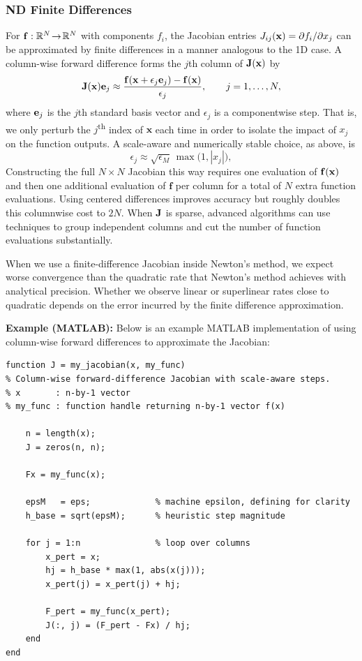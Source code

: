 \subsubsection{ND Finite Differences}
For $\mathbf{f}:\mathbb{R}^N\!\to\!\mathbb{R}^N$ with components $f_i$, the Jacobian entries $J_{ij}(\mathbf{x})=\partial f_i/\partial x_j$ can be approximated by finite differences in a manner analogous to the 1D case. A column-wise forward difference forms the $j$th column of $\mathbf{J}(\mathbf{x})$ by
\begin{equation}
  \mathbf{J}(\mathbf{x})\mathbf{e}_j
  \approx
  \frac{\mathbf{f}(\mathbf{x}+\epsilon_j \mathbf{e}_j)-\mathbf{f}(\mathbf{x})}{\epsilon_j},
  \qquad j=1,\ldots,N,
\end{equation}
where $\mathbf{e}_j$ is the $j$th standard basis vector and $\epsilon_j$ is a componentwise step. That is, we only perturb the $j$\textsuperscript{th} index of $\mathbf{x}$ each time in order to isolate the impact of $x_j$ on the function outputs. A scale-aware and numerically stable choice, as above, is
\begin{equation}
  \epsilon_j \approx \sqrt{\epsilon_M}\,\max\!\bigl(1,|x_j|\bigr),
\end{equation}
Constructing the full $N\times N$ Jacobian this way requires one evaluation of $\mathbf{f}(\mathbf{x})$ and then one additional evaluation of $\mathbf f$ per column for a total of $N$ extra function evaluations. Using centered differences improves accuracy but roughly doubles this columnwise cost to $2N$. When $\mathbf{J}$ is sparse, advanced algorithms can use techniques to group independent columns and cut the number of function evaluations substantially.

When we use a finite-difference Jacobian inside Newton's method, we expect worse convergence than the quadratic rate that Newton's method achieves with analytical precision. Whether we observe linear or superlinear rates close to quadratic depends on the error incurred by the finite difference approximation. 

\begin{exampleBox}
    \textbf{Example (MATLAB):} Below is an example MATLAB implementation of using column-wise forward differences to approximate the Jacobian:
    \begin{lstlisting}
function J = my_jacobian(x, my_func)
% Column-wise forward-difference Jacobian with scale-aware steps.
% x       : n-by-1 vector
% my_func : function handle returning n-by-1 vector f(x)

    n = length(x);
    J = zeros(n, n);

    Fx = my_func(x);

    epsM   = eps;             % machine epsilon, defining for clarity
    h_base = sqrt(epsM);      % heuristic step magnitude

    for j = 1:n               % loop over columns
        x_pert = x;
        hj = h_base * max(1, abs(x(j)));
        x_pert(j) = x_pert(j) + hj;

        F_pert = my_func(x_pert);
        J(:, j) = (F_pert - Fx) / hj;
    end
end
    \end{lstlisting}
\end{exampleBox}

